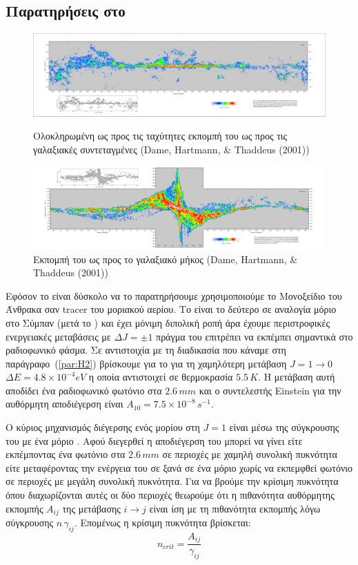 \documentclass[a4paper,12pt]{memoir}
\begin{document}
\subsection{Παρατηρήσεις στο  }
\label{par:criticaldensity}
\begin{figure}[h]
	\centering
	\includegraphics[width=17cm]{images/CO_long_lat.pdf}
	\caption{Ολοκληρωμένη ως προς τις ταχύτητες εκπομπή του  ως προς τις γαλαξιακές συντεταγμένες (Dame, Hartmann, \& Thaddeus (2001))}
	
		\centering
		\includegraphics[width=17cm]{images/CO_long_vel.pdf}
		\caption{Εκπομπή του  ως προς το γαλαξιακό μήκος (Dame, Hartmann, \& Thaddeus (2001))}
\end{figure}

Εφόσον το  είναι δύσκολο να το παρατηρήσουμε χρησιμοποιούμε το Μονοξείδιο του Άνθρακα  σαν tracer  του μοριακού αερίου. Το  είναι το δεύτερο σε αναλογία μόριο στο Σύμπαν (μετά το ) και έχει μόνιμη διπολική ροπή άρα έχουμε περιστροφικές ενεργειακές μεταβάσεις με $\Delta J=\pm 1$ πράγμα του επιτρέπει να εκπέμπει σημαντικά στο ραδιοφωνικό φάσμα. 
Σε αντιστοιχία με τη διαδικασία που κάναμε στη παράγραφο~(\ref{par:H2}) βρίσκουμε για το  για τη χαμηλότερη μετάβαση $J=1\rightarrow 0$ $\Delta E=4.8\times 10^{-4} eV$ η οποία αντιστοιχεί σε θερμοκρασία $5.5 \, K$. Η μετάβαση αυτή αποδίδει ένα ραδιοφωνικό φωτόνιο στα $2.6 \, mm$ και ο συντελεστής Einstein για την αυθόρμητη αποδιέγερση είναι $A_{10}=7.5\times 10^{-8} \, s^{-1}$.

Ο κύριος μηχανισμός διέγερσης ενός μορίου  στη $J=1$ είναι μέσω της σύγκρουσης του με ένα μόριο . Αφού διεγερθεί η αποδιέγερση του μπορεί να γίνει είτε εκπέμποντας ένα φωτόνιο στα $2.6 \, mm$ σε περιοχές με χαμηλή συνολική πυκνότητα είτε μεταφέροντας την ενέργεια του σε ξανά σε ένα μόριο  χωρίς να εκπεμφθεί φωτόνιο σε περιοχές με μεγάλη συνολική πυκνότητα. Για να βρούμε την κρίσιμη πυκνότητα όπου διαχωρίζονται αυτές οι δύο περιοχές θεωρούμε ότι η πιθανότητα αυθόρμητης εκπομπής $A_{ij}$ της μετάβασης $i\rightarrow j$ είναι ίση με τη πιθανότητα εκπομπής λόγω σύγκρουσης $n \, \gamma _{ij}$. Επομένως η κρίσιμη πυκνότητα βρίσκεται:
\begin{equation}
n_{crit}=\frac{A_{ij}}{\gamma _{ij}}
\end{equation} 
\end{document}
